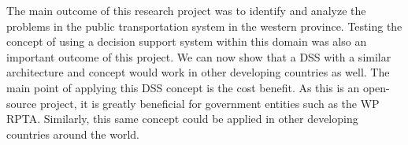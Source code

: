 The main outcome of this research project was to identify and analyze the problems in the public transportation system in the western province. Testing the concept of using a decision support system within this domain was also an important outcome of this project. We can now show that a DSS with a similar architecture and concept would work in other developing countries as well. The main point of applying this DSS concept is the cost benefit. As this is an open-source project, it is greatly beneficial for government entities such as the WP RPTA. Similarly, this same concept could be applied in other developing countries around the world.